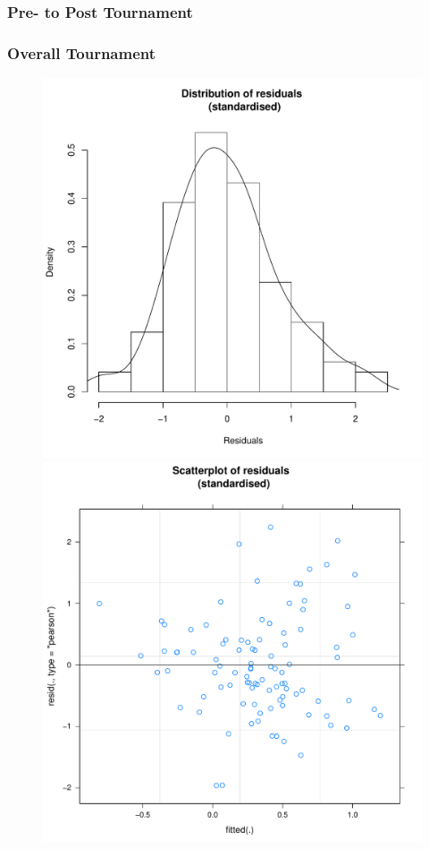 \begin{CJK}{UTF8}{gbsn}
      \subsubsection{Pre- to Post Tournament\label{app8:prediction1cPrePost}}

      




      \subsubsection{Overall Tournament\label{app8:prediction1cOverall}}

      \begin{figure}[htbp]
        \includegraphics[scale =.4]{images/MLM23aHist.pdf}
        \includegraphics[scale =.4]{images/MLM23aScatter.pdf}

\end{figure}
\end{CJK}
